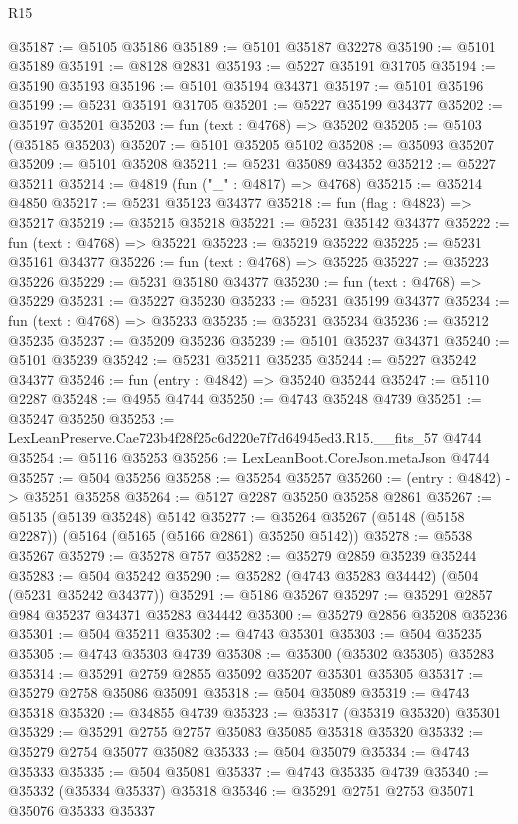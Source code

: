 \begin{lexlean}{R15}
\begin{coremodule}
{{{{{{{{{{{@35187 := @5105 @35186
@35189 := @5101 @35187 @32278
@35190 := @5101 @35189
@35191 := @8128 @2831
@35193 := @5227 @35191 @31705
@35194 := @35190 @35193
@35196 := @5101 @35194 @34371
@35197 := @5101 @35196
@35199 := @5231 @35191 @31705
@35201 := @5227 @35199 @34377
@35202 := @35197 @35201
@35203 := fun (text : @4768) => @35202
@35205 := @5103 (@35185 @35203)
@35207 := @5101 @35205 @5102
@35208 := @35093 @35207
@35209 := @5101 @35208
@35211 := @5231 @35089 @34352
@35212 := @5227 @35211
@35214 := @4819 (fun ("_" : @4817) => @4768)
@35215 := @35214 @4850
@35217 := @5231 @35123 @34377
@35218 := fun (flag : @4823) => @35217
@35219 := @35215 @35218
@35221 := @5231 @35142 @34377
@35222 := fun (text : @4768) => @35221
@35223 := @35219 @35222
@35225 := @5231 @35161 @34377
@35226 := fun (text : @4768) => @35225
@35227 := @35223 @35226
@35229 := @5231 @35180 @34377
@35230 := fun (text : @4768) => @35229
@35231 := @35227 @35230
@35233 := @5231 @35199 @34377
@35234 := fun (text : @4768) => @35233
@35235 := @35231 @35234
@35236 := @35212 @35235
@35237 := @35209 @35236
@35239 := @5101 @35237 @34371
@35240 := @5101 @35239
@35242 := @5231 @35211 @35235
@35244 := @5227 @35242 @34377
@35246 := fun (entry : @4842) => @35240 @35244
@35247 := @5110 @2287
@35248 := @4955 @4744
@35250 := @4743 @35248 @4739
@35251 := @35247 @35250
@35253 := LexLeanPreserve.Cae723b4f28f25c6d220e7f7d64945ed3.R15.__fits_57 @4744
@35254 := @5116 @35253
@35256 := LexLeanBoot.CoreJson.metaJson @4744
@35257 := @504 @35256
@35258 := @35254 @35257
@35260 := (entry : @4842) -> @35251 @35258
@35264 := @5127 @2287 @35250 @35258 @2861
@35267 := @5135 (@5139 @35248) @5142
@35277 := @35264 @35267 (@5148 (@5158 @2287)) (@5164 (@5165 (@5166 @2861) @35250 @5142))
@35278 := @5538 @35267
@35279 := @35278 @757
@35282 := @35279 @2859 @35239 @35244
@35283 := @504 @35242
@35290 := @35282 (@4743 @35283 @34442) (@504 (@5231 @35242 @34377))
@35291 := @5186 @35267
@35297 := @35291 @2857 @984 @35237 @34371 @35283 @34442
@35300 := @35279 @2856 @35208 @35236
@35301 := @504 @35211
@35302 := @4743 @35301
@35303 := @504 @35235
@35305 := @4743 @35303 @4739
@35308 := @35300 (@35302 @35305) @35283
@35314 := @35291 @2759 @2855 @35092 @35207 @35301 @35305
@35317 := @35279 @2758 @35086 @35091
@35318 := @504 @35089
@35319 := @4743 @35318
@35320 := @34855 @4739
@35323 := @35317 (@35319 @35320) @35301
@35329 := @35291 @2755 @2757 @35083 @35085 @35318 @35320
@35332 := @35279 @2754 @35077 @35082
@35333 := @504 @35079
@35334 := @4743 @35333
@35335 := @504 @35081
@35337 := @4743 @35335 @4739
@35340 := @35332 (@35334 @35337) @35318
@35346 := @35291 @2751 @2753 @35071 @35076 @35333 @35337
}}}}}}}}}}}
\end{coremodule}
\end{lexlean}
